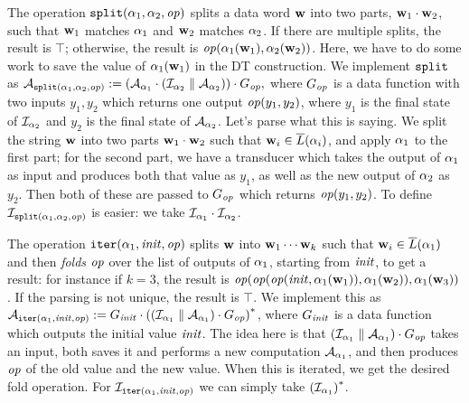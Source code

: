 The operation $\texttt{split}(\alpha_1, \alpha_2, \mathit{op})$ splits a data word $\textbf{w}$ into two parts, $\textbf{w}_1 \cdot \textbf{w}_2$, such that $\textbf{w}_1$ matches $\alpha_1$ and $\textbf{w}_2$ matches $\alpha_2$. If there are multiple splits, the result is $\top$; otherwise, the result is $\mathit{op}(\alpha_1(\textbf{w}_1),\alpha_2(\textbf{w}_2))$.
Here, we have to do some work to save the value of $\alpha_1(\textbf{w}_1)$ in the DT construction. We implement $\texttt{split}$ as
$\mathcal{A}_{\texttt{split}(\alpha_1, \alpha_2,\mathit{op})}
:= (\mathcal{A}_{\alpha_1} \cdot (\mathcal{I}_{\alpha_2} \; \| \; \mathcal{A}_{\alpha_2})) \cdot G_{\mathit{op}},$
where $G_{\mathit{op}}$ is a data function with two inputs $y_1, y_2$ which returns one output $\mathit{op}(y_1,y_2)$, where $y_1$ is the final state of $\mathcal{I}_{\alpha_2}$ and $y_2$ is the final state of $\mathcal{A}_{\alpha_2}$. Let's parse what this is saying. We split the string $\textbf{w}$ into two parts $\textbf{w}_1 \cdot \textbf{w}_2$ such that $\textbf{w}_i \in \overline{L}(\alpha_i)$, and apply $\alpha_1$ to the first part; for the second part, we have a transducer which takes the output of $\alpha_1$ as input and produces both that value as $y_1$, as well as the new output of $\alpha_2$ as $y_2$. Then both of these are passed to $G_{\mathit{op}}$ which returns $\mathit{op}(y_1, y_2)$. To define $\mathcal{I}_{\texttt{split}(\alpha_1,\alpha_2,\mathit{op})}$ is easier: we take $\mathcal{I}_{\alpha_1} \cdot \mathcal{I}_{\alpha_2}$.

The operation $\texttt{iter}(\alpha_1,\mathit{init},\mathit{op})$ splits $\textbf{w}$ into $\textbf{w}_1 \cdots \textbf{w}_k$ such that $\textbf{w}_i \in \overline{L}(\alpha_1)$ and then \emph{folds} $\mathit{op}$ over the list of outputs of $\alpha_1$, starting from $\mathit{init}$, to get a result: for instance if $k=3$, the result is $\mathit{op}(\mathit{op}(\mathit{op}(\mathit{init},\alpha_1(\textbf{w}_1)),\alpha_1(\textbf{w}_2)),\alpha_1(\textbf{w}_3))$. If the parsing is not unique, the result is $\top$. We implement this as
$\mathcal{A}_{\texttt{iter}(\alpha_1,\mathit{init},\mathit{op})} :=
G_{\mathit{init}} \cdot {{\left((\mathcal{I}_{\alpha_1} \; \| \; \mathcal{A}_{\alpha_1}) \cdot G_{\mathit{op}}\right)}^{*}}$,
where $G_{\mathit{init}}$ is a data function which outputs the initial value $\mathit{init}$.
The idea here is that $(\mathcal{I}_{\alpha_1} \; \| \; \mathcal{A}_{\alpha_1}) \cdot G_{\mathit{op}}$ takes an input, both saves it and performs a new computation $\mathcal{A}_{\alpha_1}$, and then produces $\mathit{op}$ of the old value and the new value. When this is iterated, we get the desired fold operation.
For $\mathcal{I}_{\texttt{iter}(\alpha_1,\mathit{init},\mathit{op})}$ we can simply take ${{(\mathcal{I}_{\alpha_1})}^{*}}$.

